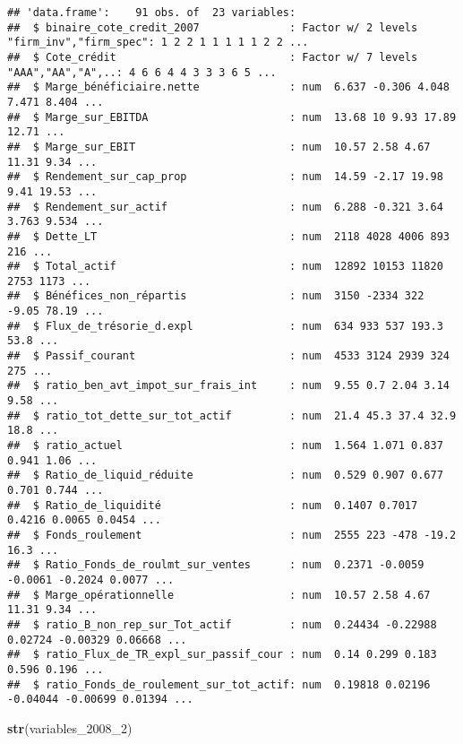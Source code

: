\documentclass[
]{article}
\newenvironment{Shaded}{\begin{snugshade}}{\end{snugshade}}
\newcommand{\DecValTok}[1]{\textcolor[rgb]{0.00,0.00,0.81}{#1}}
\newcommand{\KeywordTok}[1]{\textcolor[rgb]{0.13,0.29,0.53}{\textbf{#1}}}
\newcommand{\NormalTok}[1]{#1}
\begin{document}
\begin{verbatim}
## 'data.frame':    91 obs. of  23 variables:
##  $ binaire_cote_credit_2007              : Factor w/ 2 levels "firm_inv","firm_spec": 1 2 2 1 1 1 1 1 2 2 ...
##  $ Cote_crédit                           : Factor w/ 7 levels "AAA","AA","A",..: 4 6 6 4 4 3 3 3 6 5 ...
##  $ Marge_bénéficiaire.nette              : num  6.637 -0.306 4.048 7.471 8.404 ...
##  $ Marge_sur_EBITDA                      : num  13.68 10 9.93 17.89 12.71 ...
##  $ Marge_sur_EBIT                        : num  10.57 2.58 4.67 11.31 9.34 ...
##  $ Rendement_sur_cap_prop                : num  14.59 -2.17 19.98 9.41 19.53 ...
##  $ Rendement_sur_actif                   : num  6.288 -0.321 3.64 3.763 9.534 ...
##  $ Dette_LT                              : num  2118 4028 4006 893 216 ...
##  $ Total_actif                           : num  12892 10153 11820 2753 1173 ...
##  $ Bénéfices_non_répartis                : num  3150 -2334 322 -9.05 78.19 ...
##  $ Flux_de_trésorie_d.expl               : num  634 933 537 193.3 53.8 ...
##  $ Passif_courant                        : num  4533 3124 2939 324 275 ...
##  $ ratio_ben_avt_impot_sur_frais_int     : num  9.55 0.7 2.04 3.14 9.58 ...
##  $ ratio_tot_dette_sur_tot_actif         : num  21.4 45.3 37.4 32.9 18.8 ...
##  $ ratio_actuel                          : num  1.564 1.071 0.837 0.941 1.06 ...
##  $ Ratio_de_liquid_réduite               : num  0.529 0.907 0.677 0.701 0.744 ...
##  $ Ratio_de_liquidité                    : num  0.1407 0.7017 0.4216 0.0065 0.0454 ...
##  $ Fonds_roulement                       : num  2555 223 -478 -19.2 16.3 ...
##  $ Ratio_Fonds_de_roulmt_sur_ventes      : num  0.2371 -0.0059 -0.0061 -0.2024 0.0077 ...
##  $ Marge_opérationnelle                  : num  10.57 2.58 4.67 11.31 9.34 ...
##  $ ratio_B_non_rep_sur_Tot_actif         : num  0.24434 -0.22988 0.02724 -0.00329 0.06668 ...
##  $ ratio_Flux_de_TR_expl_sur_passif_cour : num  0.14 0.299 0.183 0.596 0.196 ...
##  $ ratio_Fonds_de_roulement_sur_tot_actif: num  0.19818 0.02196 -0.04044 -0.00699 0.01394 ...
\end{verbatim}

\begin{Shaded}
\begin{Highlighting}[]
\KeywordTok{str}\NormalTok{(variables_}\DecValTok{2008}\NormalTok{_}\DecValTok{2}\NormalTok{)}
\end{Highlighting}
\end{Shaded}
\end{document}
